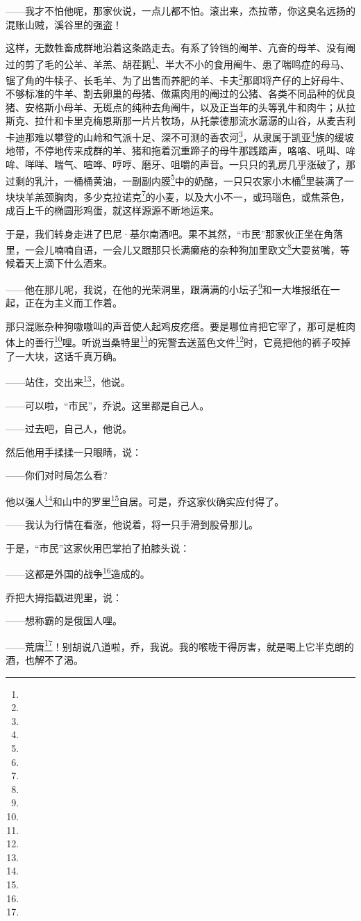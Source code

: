 \par ——我才不怕他呢，那家伙说，一点儿都不怕。滚出来，杰拉蒂，你这臭名远扬的混账山贼，溪谷里的强盗！
\par 这样，无数牲畜成群地沿着这条路走去。有系了铃铛的阉羊、亢奋的母羊、没有阉过的剪了毛的公羊、羊羔、胡茬鹅\footnote{}、半大不小的食用阉牛、患了喘鸣症的母马、锯了角的牛犊子、长毛羊、为了出售而养肥的羊、卡夫\footnote{}那即将产仔的上好母牛、不够标准的牛羊、割去卵巢的母猪、做熏肉用的阉过的公猪、各类不同品种的优良猪、安格斯小母羊、无斑点的纯种去角阉牛，以及正当年的头等乳牛和肉牛；从拉斯克、拉什和卡里克梅恩斯那一片片牧场，从托蒙德那流水潺潺的山谷，从麦吉利卡迪那难以攀登的山岭和气派十足、深不可测的香农河\footnote{}，从隶属于凯亚\footnote{}族的缓坡地带，不停地传来成群的羊、猪和拖着沉重蹄子的母牛那践踏声，咯咯、吼叫、哞哞、咩咩、喘气、喧哗、哼哼、磨牙、咀嚼的声音。一只只的乳房几乎涨破了，那过剩的乳汁，一桶桶黄油，一副副内膜\footnote{}中的奶酪，一只只农家小木桶\footnote{}里装满了一块块羊羔颈胸肉，多少克拉诺克\footnote{}的小麦，以及大小不一，或玛瑙色，或焦茶色，成百上千的椭圆形鸡蛋，就这样源源不断地运来。
\par 于是，我们转身走进了巴尼·基尔南酒吧。果不其然，“市民”那家伙正坐在角落里，一会儿喃喃自语，一会儿又跟那只长满癞疮的杂种狗加里欧文\footnote{}大耍贫嘴，等候着天上滴下什么酒来。
\par ——他在那儿呢，我说，在他的光荣洞里，跟满满的小坛子\footnote{}和一大堆报纸在一起，正在为主义而工作着。
\par 那只混账杂种狗嗷嗷叫的声音使人起鸡皮疙瘩。要是哪位肯把它宰了，那可是桩肉体上的善行\footnote{}哩。听说当桑特里\footnote{}的宪警去送蓝色文件\footnote{}时，它竟把他的裤子咬掉了一大块，这话千真万确。
\par ——站住，交出来\footnote{}，他说。
\par ——可以啦，“市民”，乔说。这里都是自己人。
\par ——过去吧，自己人，他说。
\par 然后他用手揉揉一只眼睛，说：
\par ——你们对时局怎么看?
\par 他以强人\footnote{}和山中的罗里\footnote{}自居。可是，乔这家伙确实应付得了。
\par ——我认为行情在看涨，他说着，将一只手滑到股骨那儿。
\par 于是，“市民”这家伙用巴掌拍了拍膝头说：
\par ——这都是外国的战争\footnote{}造成的。
\par 乔把大拇指戳进兜里，说：
\par ——想称霸的是俄国人哩。
\par ——荒唐\footnote{}！别胡说八道啦，乔，我说。我的喉咙干得厉害，就是喝上它半克朗的酒，也解不了渴。
